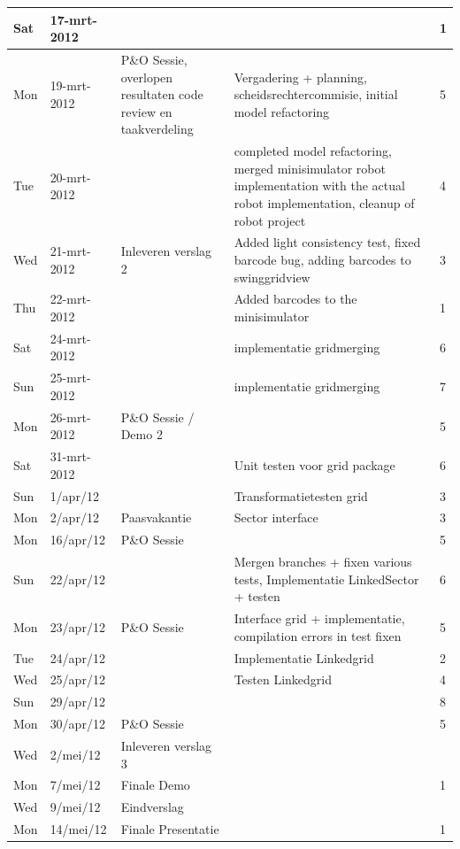 \documentclass[12pt,a4paper]{report}
\begin{document}
\begin{landscape}
\begin{longtable}{llp{7cm}p{10cm}l}
\hline
Sat & 17-mrt-2012 &  &  & 1 \\ 
\hline
Mon & 19-mrt-2012 & P\&O Sessie, overlopen resultaten code review en taakverdeling & Vergadering + planning, scheidsrechtercommisie, initial model refactoring & 5 \\ 
\hline
Tue & 20-mrt-2012 &  & completed model refactoring, merged minisimulator robot implementation with the actual robot implementation, cleanup of robot project & 4 \\ 
\hline
Wed & 21-mrt-2012 & Inleveren verslag 2 & Added light consistency test, fixed barcode bug, adding barcodes to swinggridview & 3 \\ 
\hline
Thu & 22-mrt-2012 &  & Added barcodes to the minisimulator & 1 \\ 
\hline
Sat & 24-mrt-2012 &  & implementatie gridmerging & 6 \\ 
\hline
Sun & 25-mrt-2012 &  & implementatie gridmerging & 7 \\ 
\hline
Mon & 26-mrt-2012 & P\&O Sessie / Demo 2 &  & 5 \\ 
\hline
Sat & 31-mrt-2012 &  & Unit testen voor grid package & 6 \\ 
\hline
Sun & 1/apr/12 &  & Transformatietesten grid & 3 \\ 
\hline
Mon & 2/apr/12 & Paasvakantie & Sector interface & 3 \\ 
\hline
Mon & 16/apr/12 & P\&O Sessie &  & 5 \\ 
\hline
Sun & 22/apr/12 &  & Mergen branches + fixen various tests, Implementatie LinkedSector + testen & 6 \\ 
\hline
Mon & 23/apr/12 & P\&O Sessie & Interface grid + implementatie, compilation errors in test fixen & 5 \\ 
\hline
Tue & 24/apr/12 &  & Implementatie Linkedgrid & 2 \\ 
\hline
Wed & 25/apr/12 &  & Testen Linkedgrid & 4 \\ 
\hline
Sun & 29/apr/12 &  &  & 8 \\ 
\hline
Mon & 30/apr/12 & P\&O Sessie &  & 5 \\ 
\hline
Wed & 2/mei/12 & Inleveren verslag 3 &  &  \\ 
\hline
Mon & 7/mei/12 & Finale Demo &  & 1 \\ 
\hline
Wed & 9/mei/12 & Eindverslag &  &  \\ 
\hline
Mon & 14/mei/12 & Finale Presentatie &  & 1 \\ 
\hline
\end{longtable}
\normalsize



\end{landscape}
\end{document}
